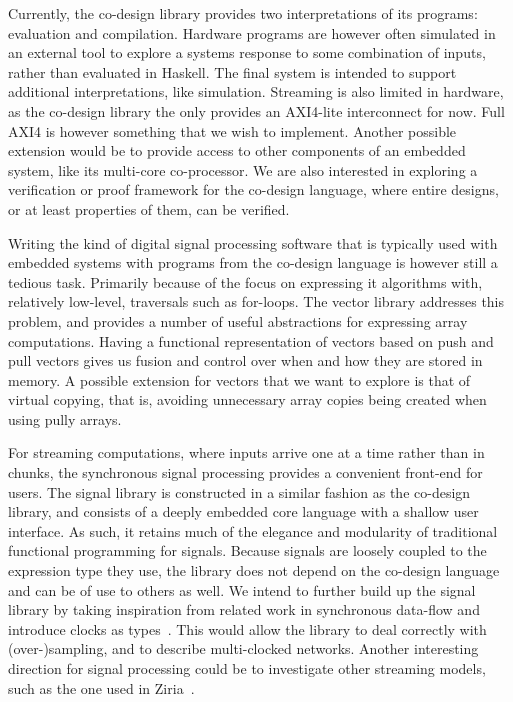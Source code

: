 \documentclass[../paper.tex]{subfiles}
\begin{document}

Currently, the co-design library provides two interpretations of its programs: evaluation and compilation. Hardware programs are however often simulated in an external tool to explore a systems response to some combination of inputs, rather than evaluated in Haskell. The final system is intended to support additional interpretations, like simulation. Streaming is also limited in hardware, as the co-design library the only provides an AXI4-lite interconnect for now. Full AXI4 is however something that we wish to implement. Another possible extension would be to provide access to other components of an embedded system, like its multi-core co-processor. We are also interested in exploring a verification or proof framework for the co-design language, where entire designs, or at least properties of them, can be verified.

Writing the kind of digital signal processing software that is typically used with embedded systems with programs from the co-design language is however still a tedious task. Primarily because of the focus on expressing it algorithms with, relatively low-level, traversals such as for-loops. The vector library addresses this problem, and provides a number of useful abstractions for expressing array computations. Having a functional representation of vectors based on push and pull vectors gives us fusion and control over when and how they are stored in memory. A possible extension for vectors that we want to explore is that of virtual copying, that is, avoiding unnecessary array copies being created when using pully arrays.

For streaming computations, where inputs arrive one at a time rather than in chunks, the synchronous signal processing provides a convenient front-end for users. The signal library is constructed in a similar fashion as the co-design library, and consists of a deeply embedded core language with a shallow user interface. As such, it retains much of the elegance and modularity of traditional functional programming for signals. Because signals are loosely coupled to the expression type they use, the library does not depend on the co-design language and can be of use to others as well. We intend to further build up the signal library by taking inspiration from related work in synchronous data-flow and introduce clocks as types~\cite{lucy2008}. This would allow the library to deal correctly with (over-)sampling, and to describe multi-clocked networks. Another interesting direction for signal processing could be to investigate other streaming models, such as the one used in Ziria~\cite{ziria2015, fudgets1993}.
\end{document}
